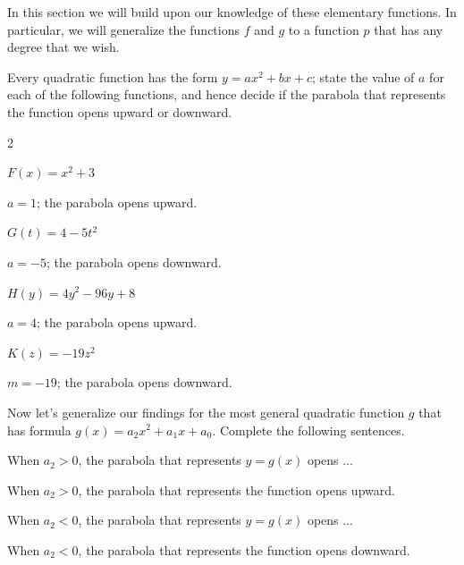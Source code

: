  In this section we will build upon our knowledge of these elementary
 functions. In particular, we will generalize the functions $f$ and $g$ to a function $p$ that has
 any degree that we wish.

 \begin{essentialskills}
	 \begin{problem}
	 Every quadratic function has the form $y=ax^2+bx+c$; state the value
	 of $a$ for each of the following functions, and hence decide if the
	 parabola that represents the function opens upward or downward.
	 \begin{multicols}{2}
		 \begin{subproblem}
			 $F(x)=x^2+3$
			 \begin{shortsolution}
				 $a=1$; the parabola opens upward.
			 \end{shortsolution}
		 \end{subproblem}
		 \begin{subproblem}
			 $G(t)=4-5t^2$
			 \begin{shortsolution}
				 $a=-5$; the parabola opens downward.
			 \end{shortsolution}
		 \end{subproblem}
		 \begin{subproblem}
			 $H(y)=4y^2-96y+8$
			 \begin{shortsolution}
				 $a=4$; the parabola opens upward.
			 \end{shortsolution}
		 \end{subproblem}
		 \begin{subproblem}
			 $K(z)=-19z^2$
			 \begin{shortsolution}
				 $m=-19$; the parabola opens downward.
			 \end{shortsolution}
		 \end{subproblem}
	 \end{multicols}
	 Now let's generalize our findings for the most general quadratic function $g$
	 that has formula $g(x)=a_2x^2+a_1x+a_0$. Complete the following sentences.
	 \begin{subproblem}
		 When $a_2>0$, the parabola that represents $y=g(x)$ opens $\ldots$
		 \begin{shortsolution}
			 When $a_2>0$, the parabola that represents the function opens upward.
		 \end{shortsolution}
	 \end{subproblem}
	 \begin{subproblem}
		 When $a_2<0$, the parabola that represents $y=g(x)$ opens $\ldots$
		 \begin{shortsolution}
			 When $a_2<0$, the parabola that represents the function opens downward.
		 \end{shortsolution}
	 \end{subproblem}
	 \end{problem}
 \end{essentialskills}

